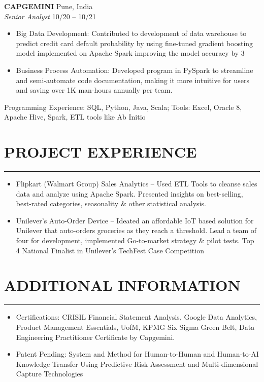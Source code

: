 \documentclass[10pt,letterpaper]{article}
\newcommand{\sectionline}{\par\vspace{-0.5em}\noindent\rule{\textwidth}{0.6pt}\vspace{0.3em}\par}
\begin{document}
\noindent\textbf{CAPGEMINI} \hfill Pune, India\\
\textit{Senior Analyst} \hfill 10/20 -- 10/21
\begin{itemize}
  \item Big Data Development: Contributed to development of data warehouse to predict credit card default probability by using fine-tuned gradient boosting model implemented on Apache Spark improving the model accuracy by 3%
  \item Business Process Automation: Developed program in PySpark to streamline and semi-automate code documentation, making it more intuitive for users and saving over 1K man-hours annually per team.
\end{itemize}
Programming Experience: SQL, Python, Java, Scala; Tools: Excel, Oracle 8, Apache Hive, Spark, ETL tools like Ab Initio

\section*{PROJECT EXPERIENCE}
\sectionline

\begin{itemize}
  \item Flipkart (Walmart Group) Sales Analytics -- Used ETL Tools to cleanse sales data and analyze using Apache Spark. Presented insights on best-selling, best-rated categories, seasonality \& other statistical analysis.
  \item Unilever's Auto-Order Device -- Ideated an affordable IoT based solution for Unilever that auto-orders groceries as they reach a threshold. Lead a team of four for development, implemented Go-to-market strategy \& pilot tests. Top 4 National Finalist in Unilever's TechFest Case Competition
\end{itemize}

\section*{ADDITIONAL INFORMATION}
\sectionline

\begin{itemize}
  \item Certifications: CRISIL Financial Statement Analysis, Google Data Analytics, Product Management Essentials, UofM, KPMG Six Sigma Green Belt, Data Engineering Practitioner Certificate by Capgemini.
  \item Patent Pending: System and Method for Human-to-Human and Human-to-AI Knowledge Transfer Using Predictive Risk Assessment and Multi-dimensional Capture Technologies
\end{itemize}
\end{document}
